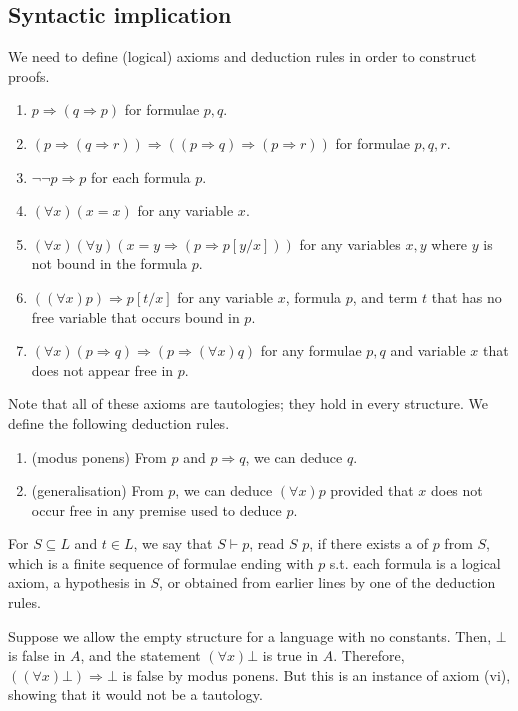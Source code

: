 \subsection{Syntactic implication}
We need to define (logical) axioms and deduction rules in order to construct proofs.
\begin{enumerate}
    \item $p \Rightarrow (q \Rightarrow p)$ for formulae $p, q$.
    \item $(p \Rightarrow (q \Rightarrow r)) \Rightarrow ((p \Rightarrow q) \Rightarrow (p \Rightarrow r))$ for formulae $p, q, r$.
    \item $\neg\neg p \Rightarrow p$ for each formula $p$.
    \item $(\forall x)(x = x)$ for any variable $x$.
    \item $(\forall x)(\forall y)(x = y \Rightarrow (p \Rightarrow p[y/x]))$ for any variables $x, y$ where $y$ is not bound in the formula $p$.
    \item $((\forall x)p) \Rightarrow p[t/x]$ for any variable $x$, formula $p$, and term $t$ that has no free variable that occurs bound in $p$.
    \item $(\forall x)(p \Rightarrow q) \Rightarrow (p \Rightarrow (\forall x)q)$ for any formulae $p, q$ and variable $x$ that does not appear free in $p$.
\end{enumerate}
Note that all of these axioms are tautologies; they hold in every structure.
We define the following deduction rules.
\begin{enumerate}
    \item (modus ponens) From $p$ and $p \Rightarrow q$, we can deduce $q$.
    \item (generalisation) From $p$, we can deduce $(\forall x)p$ provided that $x$ does not occur free in any premise used to deduce $p$.
\end{enumerate}
For $S \subseteq L$ and $t \in L$, we say that $S \vdash p$, read $S$  $p$, if there exists a  of $p$ from $S$, which is a finite sequence of formulae ending with $p$ s.t. each formula is a logical axiom, a hypothesis in $S$, or obtained from earlier lines by one of the deduction rules.
\begin{remark}
    Suppose we allow the empty structure for a language with no constants.
    Then, $\bot$ is false in $A$, and the statement $(\forall x)\bot$ is true in $A$.
    Therefore, $((\forall x)\bot) \Rightarrow \bot$ is false by modus ponens.
    But this is an instance of axiom (vi), showing that it would not be a tautology.
\end{remark}
